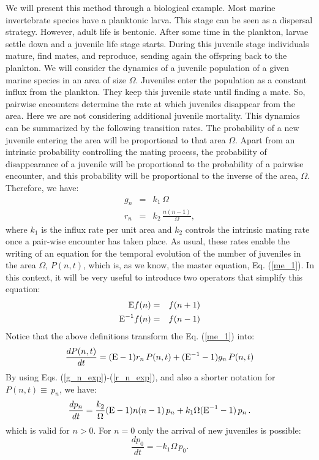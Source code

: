 We will present this method through a biological example. Most marine invertebrate species have a planktonic larva. This stage can be seen as a dispersal strategy. However, adult life is bentonic. After some time in the plankton, larvae settle down and a juvenile life stage starts. During this juvenile stage individuals mature, find mates, and reproduce, sending again the offspring back to the plankton. We will consider the dynamics of a juvenile population of a given marine species in an area of size $\Omega$. Juveniles enter the population as a constant influx from the plankton. They keep this juvenile state until finding a mate. So, pairwise encounters determine the rate at which juveniles disappear from the area. Here we are not considering additional juvenile mortality. This dynamics can be summarized by the following transition rates. The probability of a new juvenile entering the area will be proportional to that area $\Omega$. Apart from an intrinsic probability controlling the mating process, the probability of disappearance of a juvenile will be proportional to the probability of a pairwise encounter, and this probability will be proportional to the inverse of the area, $\Omega$. 
Therefore, we have:
\begin{eqnarray}
	\label{g_n_exp}
	g_n &=& k_{1}\,\Omega\\
	r_n &=& k_{2}\,\frac{n(n-1)}{\Omega},
	\label{r_n_exp}
\end{eqnarray}
where $k_{1}$ is the influx rate per unit area and $k_{2}$ controls the intrinsic mating rate once a pair-wise encounter has taken place. As usual, these rates enable the writing of an equation for the temporal evolution of the number of juveniles in the area $\Omega$, $P(n,t)$, which is, as we know, the master equation, Eq. (\ref{me_1}). In this context, it will be very useful to introduce two operators that simplify this equation:
\begin{eqnarray}
	\label{E_1}
	\textup{E}f(n)      &=& f(n+1)\\
	\textup{E}^{-1}f(n) &=& f(n-1)
	\label{E_2}
\end{eqnarray}
Notice that the above definitions transform the Eq. (\ref{me_1}) into:
\begin{equation}
	\label{me_E}
	\frac{dP(n,t)}{dt}=(\textup{E}-1)r_n\,P(n,t) + (\textup{E}^{-1}-1)g_n\,P(n,t)
\end{equation}  
By using Eqs. (\ref{g_n_exp})-(\ref{r_n_exp}), and also a shorter notation for 
$P(n,t)\equiv\,p_n$, we have:
\begin{equation}
	\label{me_E}
	\frac{dp_n}{dt}=\frac{k_2}{\Omega}(\textup{E}-1)n(n-1)\,p_n + k_{1}\Omega(\textup{E}^{-1}-1)\,p_n\,.
\end{equation}  
which is valid for $n>0$. For $n=0$ only the arrival of new juveniles is possible:
\begin{equation}
	\frac{dp_0}{dt}= -k_{1}\Omega\,p_0.
\end{equation}
\smallskip


